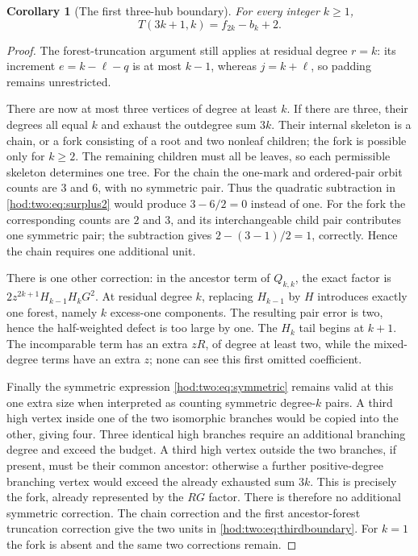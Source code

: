 \documentclass[11pt,letterpaper]{article}
\newtheorem{corollary}[theorem]{Corollary}
\theoremstyle{definition}\newtheorem{definition}[theorem]{Definition}
\theoremstyle{remark}\newtheorem{remark}[theorem]{Remark}
\begin{document}
\begin{corollary}[The first three-hub boundary]\label{hod:two:cor:thirdboundary}
For every integer $k\ge1$,
\begin{equation}\label{hod:two:eq:thirdboundary}
T(3k+1,k)=f_{2k}-b_k+2.
\end{equation}
\end{corollary}
\begin{proof}
The forest-truncation argument still applies at residual degree $r=k$: its increment $e=k-\ell-q$ is at most $k-1$, whereas $j=k+\ell$, so padding remains unrestricted.

There are now at most three vertices of degree at least $k$. If there are three, their degrees all equal $k$ and exhaust the outdegree sum $3k$. Their internal skeleton is a chain, or a fork consisting of a root and two nonleaf children; the fork is possible only for $k\ge2$. The remaining children must all be leaves, so each permissible skeleton determines one tree. For the chain the one-mark and ordered-pair orbit counts are $3$ and $6$, with no symmetric pair. Thus the quadratic subtraction in \eqref{hod:two:eq:surplus2} would produce $3-6/2=0$ instead of one. For the fork the corresponding counts are $2$ and $3$, and its interchangeable child pair contributes one symmetric pair; the subtraction gives $2-(3-1)/2=1$, correctly. Hence the chain requires one additional unit.

There is one other correction: in the ancestor term of $Q_{k,k}$, the exact factor is $2z^{2k+1}H_{k-1}H_kG^2$. At residual degree $k$, replacing $H_{k-1}$ by $H$ introduces exactly one forest, namely $k$ excess-one components. The resulting pair error is two, hence the half-weighted defect is too large by one. The $H_k$ tail begins at $k+1$. The incomparable term has an extra $zR$, of degree at least two, while the mixed-degree terms have an extra $z$; none can see this first omitted coefficient.

Finally the symmetric expression \eqref{hod:two:eq:symmetric} remains valid at this one extra size when interpreted as counting symmetric degree-$k$ pairs. A third high vertex inside one of the two isomorphic branches would be copied into the other, giving four. Three identical high branches require an additional branching degree and exceed the budget. A third high vertex outside the two branches, if present, must be their common ancestor: otherwise a further positive-degree branching vertex would exceed the already exhausted sum $3k$. This is precisely the fork, already represented by the $RG$ factor. There is therefore no additional symmetric correction. The chain correction and the first ancestor-forest truncation correction give the two units in \eqref{hod:two:eq:thirdboundary}. For $k=1$ the fork is absent and the same two corrections remain.
\end{proof}
\end{document}
